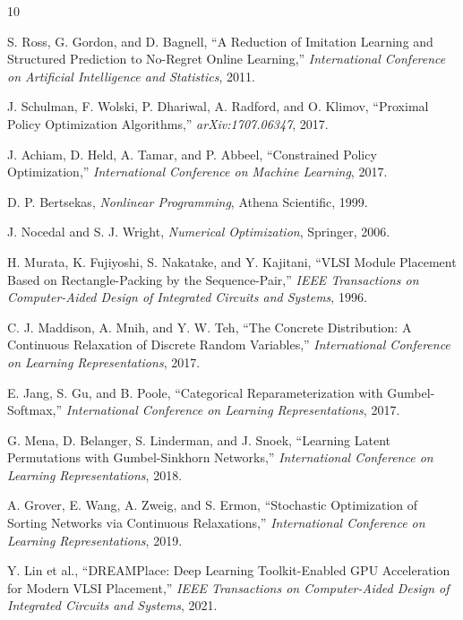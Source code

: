 \documentclass[11pt]{article}
\begin{document}
\begin{thebibliography}{10}

S. Ross, G. Gordon, and D. Bagnell,
``A Reduction of Imitation Learning and Structured Prediction to No-Regret Online Learning,''
\emph{International Conference on Artificial Intelligence and Statistics}, 2011.

J. Schulman, F. Wolski, P. Dhariwal, A. Radford, and O. Klimov,
``Proximal Policy Optimization Algorithms,''
\emph{arXiv:1707.06347}, 2017.

J. Achiam, D. Held, A. Tamar, and P. Abbeel,
``Constrained Policy Optimization,''
\emph{International Conference on Machine Learning}, 2017.

D. P. Bertsekas,
\emph{Nonlinear Programming},
Athena Scientific, 1999.

J. Nocedal and S. J. Wright,
\emph{Numerical Optimization},
Springer, 2006.

H. Murata, K. Fujiyoshi, S. Nakatake, and Y. Kajitani,
``VLSI Module Placement Based on Rectangle-Packing by the Sequence-Pair,''
\emph{IEEE Transactions on Computer-Aided Design of Integrated Circuits and Systems}, 1996.

C. J. Maddison, A. Mnih, and Y. W. Teh,
``The Concrete Distribution: A Continuous Relaxation of Discrete Random Variables,''
\emph{International Conference on Learning Representations}, 2017.

E. Jang, S. Gu, and B. Poole,
``Categorical Reparameterization with Gumbel-Softmax,''
\emph{International Conference on Learning Representations}, 2017.

G. Mena, D. Belanger, S. Linderman, and J. Snoek,
``Learning Latent Permutations with Gumbel-Sinkhorn Networks,''
\emph{International Conference on Learning Representations}, 2018.

A. Grover, E. Wang, A. Zweig, and S. Ermon,
``Stochastic Optimization of Sorting Networks via Continuous Relaxations,''
\emph{International Conference on Learning Representations}, 2019.

Y. Lin et al.,
``DREAMPlace: Deep Learning Toolkit-Enabled GPU Acceleration for Modern VLSI Placement,''
\emph{IEEE Transactions on Computer-Aided Design of Integrated Circuits and Systems}, 2021.

\end{thebibliography}
\end{document}

